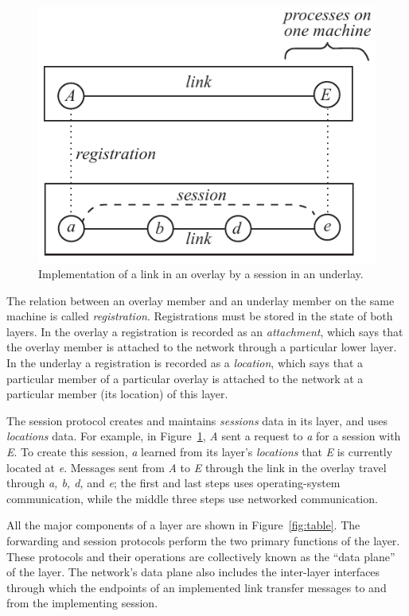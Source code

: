 \begin{figure}
\centering
\includegraphics[scale=0.80]{figures/impl.pdf}
\caption{Implementation of a link in an overlay by a session in an
underlay.}
\label{fig:impl}
\end{figure}

The relation between an overlay member and an underlay member on the
same machine is called {\it registration}.
Registrations must be stored in the state of both layers.
In the overlay a registration is recorded as an {\it attachment}, 
which says that the overlay member is attached to the network through
a particular lower layer.
In the underlay a registration is recorded as a
{\it location}, 
which says that a particular member of a particular overlay is attached to
the network at a particular member (its location) of this layer.

The session protocol creates and maintains {\it sessions} data in its
layer, and uses {\it locations} data.
For example, in Figure~\ref{fig:impl}, {\it A} sent a request to {\it a}
for a session with {\it E}.
To create this session, {\it a} learned from its layer's {\it locations}
that {\it E} is currently located at {\it e}.
Messages sent from {\it A} to {\it E} through the link in the overlay
travel through {\it a, b, d,} and {\it e}; the first and last steps
uses operating-system communication, while the middle three steps use
networked communication.

All the major components of a layer are shown in
Figure~\ref{fig:table}.
The forwarding and session protocols perform the two primary functions
of the layer.
These protocols and their operations are collectively known as the
``data plane'' of the layer.
The network's data plane also includes the inter-layer interfaces
through which the endpoints of an implemented link transfer messages to 
and from the
implementing session.

